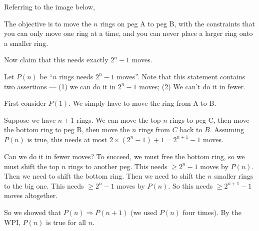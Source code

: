 \documentclass[a4paper]{article}
\begin{document}
\begin{eg}
  Referring to the image below,
  \begin{center}
    \usetikzlibrary{shapes}
  \end{center}
  The objective is to move the $n$ rings on peg A to peg B, with the constraints that you can only move one ring at a time, and you can never place a larger ring onto a smaller ring.

  Now claim that this needs exactly $2^n - 1$ moves.

  Let $P(n)$ be ``$n$ rings needs $2^n - 1$ moves''. Note that this statement contains two assertions --- (1) we can do it in $2^n - 1$ moves; (2) We can't do it in fewer.

  First consider $P(1)$. We simply have to move the ring from A to B.

  Suppose we have $n + 1$ rings. We can move the top $n$ rings to peg C, then move the bottom ring to peg B, then move the $n$ rings from $C$ back to $B$. Assuming $P(n)$ is true, this needs at most $2\times (2^n - 1) + 1 = 2^{n + 1} -1 $ moves.

  Can we do it in fewer moves? To succeed, we must free the bottom ring, so we must shift the top $n$ rings to another peg. This needs $\geq 2^n - 1$ moves by $P(n)$. Then we need to shift the bottom ring. Then we need to shift the $n$ smaller rings to the big one. This needs $\geq 2^n - 1$ moves by $P(n)$. So this needs $\geq 2^{n + 1} - 1$ moves altogether.

  So we showed that $P(n)\Rightarrow P(n + 1)$ (we used $P(n)$ four times). By the WPI, $P(n)$ is true for all $n$.
\end{eg}
\end{document}
